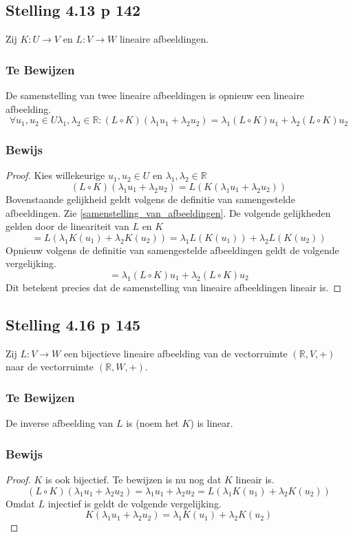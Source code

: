 \documentclass[lineaire_algebra_oplossingen.tex]{subfiles}
\begin{document}
\subsection{Stelling 4.13 p 142}
Zij $K:U\rightarrow V$ en $L:V\rightarrow W$ lineaire afbeeldingen.
\subsubsection*{Te Bewijzen}
De samenstelling van twee lineaire afbeeldingen is opnieuw een lineaire afbeelding.
\[
\forall u_1,u_2\in U \lambda_1,\lambda_2\in\mathbb{R}: (L\circ K)(\lambda_1u_1 + \lambda_2u_2) = \lambda_1(L\circ K)u_1 + \lambda_2(L\circ K)u_2
\]
\subsubsection*{Bewijs}
\begin{proof}
Kies willekeurige $u_1,u_2\in U$ en $\lambda_1,\lambda_2\in\mathbb{R}$
\[
(L\circ K)(\lambda_1u_1 + \lambda_2u_2) = L(K(\lambda_1u_1 + \lambda_2u_2))
\]
Bovenstaande gelijkheid geldt volgens de definitie van samengestelde afbeeldingen. Zie \ref{samenstelling_van_afbeeldingen}. De volgende gelijkheden gelden door de lineariteit van $L$ en $K$
\[
= L(\lambda_1K(u_1) + \lambda_2K(u_2)) = \lambda_1L(K(u_1)) + \lambda_2L(K(u_2))
\]
Opnieuw volgens de definitie van samengestelde afbeeldingen geldt de volgende vergelijking.
\[
= \lambda_1(L\circ K)u_1 + \lambda_2(L\circ K)u_2
\]
Dit betekent precies dat de samenstelling van lineaire afbeeldingen lineair is.
\end{proof}

\subsection{Stelling 4.16 p 145}
Zij $L:V\rightarrow W$ een bijectieve lineaire afbeelding van de vectorruimte $(\mathbb{R},V,+)$ naar de vectorruimte $(\mathbb{R},W,+)$.
\subsubsection*{Te Bewijzen}
De inverse afbeelding van $L$ is (noem het $K$) is linear.
\subsubsection*{Bewijs}
\begin{proof}
$K$ is ook bijectief. Te bewijzen is nu nog dat $K$ lineair is.
\[
(L\circ K)(\lambda_1u_1 + \lambda_2u_2) = \lambda_1u_1 + \lambda_2u_2 = L(\lambda_1K(u_1) + \lambda_2K(u_2))
\]
Omdat $L$ injectief is geldt de volgende vergelijking.
\[
K(\lambda_1u_1 + \lambda_2u_2) = \lambda_1K(u_1) + \lambda_2K(u_2)
\]
\end{proof}
\end{document}
